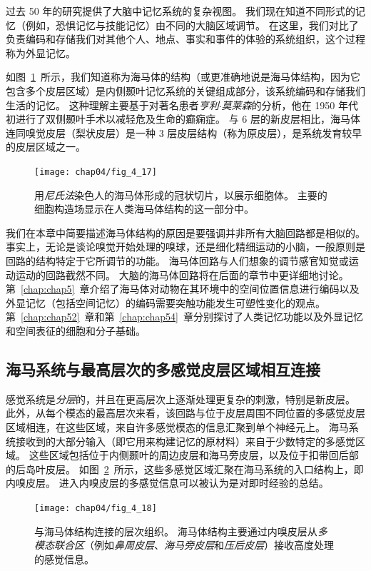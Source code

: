 过去 50 年的研究提供了大脑中记忆系统的复杂视图。 
我们现在知道不同形式的记忆（例如，恐惧记忆与技能记忆）由不同的大脑区域调节。
在这里，我们对比了负责编码和存储我们对其他个人、地点、事实和事件的体验的系统组织，这个过程称为外显记忆。


如图~\ref{fig:4_17}~所示，我们知道称为海马体的结构（或更准确地说是海马体结构，因为它包含多个皮层区域）是内侧颞叶记忆系统的关键组成部分，该系统编码和存储我们生活的记忆。 
这种理解主要基于对著名患者\textit{亨利$\cdot$莫莱森}的分析，他在 1950 年代初进行了双侧颞叶手术以减轻危及生命的癫痫症。
与 6 层的新皮层相比，海马体连同嗅觉皮层（梨状皮层）是一种 3 层皮层结构（称为原皮层），是系统发育较早的皮层区域之一。


\begin{figure}[htbp]
	\centering
	\texttt{[image: chap04/fig\_4\_17]}
	\caption{用\textit{尼氏法}染色人的海马体形成的冠状切片，以展示细胞体。
		主要的细胞构造场显示在人类海马体结构的这一部分中。}
	\label{fig:4_17}
\end{figure}


我们在本章中简要描述海马体结构的原因是要强调并非所有大脑回路都是相似的。
事实上，无论是谈论嗅觉开始处理的嗅球，还是细化精细运动的小脑，一般原则是回路的结构特定于它所调节的功能。
海马体回路与人们想象的调节感官知觉或运动运动的回路截然不同。
大脑的海马体回路将在后面的章节中更详细地讨论。 
第~\ref{chap:chap5}~章介绍了海马体对动物在其环境中的空间位置信息进行编码以及外显记忆（包括空间记忆）的编码需要突触功能发生可塑性变化的观点。 
第~\ref{chap:chap52}~章和第~\ref{chap:chap54}~章分别探讨了人类记忆功能以及外显记忆和空间表征的细胞和分子基础。



\subsection{海马系统与最高层次的多感觉皮层区域相互连接}

感觉系统是\textit{分层}的，并且在更高层次上逐渐处理更复杂的刺激，特别是新皮层。
此外，从每个模态的最高层次来看，该回路与位于皮层周围不同位置的多感觉皮层区域相连，在这些区域，来自许多感觉模态的信息汇聚到单个神经元上。
海马系统接收到的大部分输入（即它用来构建记忆的原材料）来自于少数特定的多感觉区域。
这些区域包括位于内侧颞叶的周边皮层和海马旁皮层，以及位于扣带回后部的后岛叶皮层。
如图~\ref{fig:4_18}~所示，这些多感觉区域汇聚在海马系统的入口结构上，即内嗅皮层。 
进入内嗅皮层的多感觉信息可以被认为是对即时经验的总结。


\begin{figure}[htbp]
	\centering
	\texttt{[image: chap04/fig\_4\_18]}
	\caption{与海马体结构连接的层次组织。
		海马体结构主要通过内嗅皮层从\textit{多模态联合区}（例如\textit{鼻周皮层}、\textit{海马旁皮层}和\textit{压后皮层}）接收高度处理的感觉信息。}
	\label{fig:4_18}
\end{figure}



